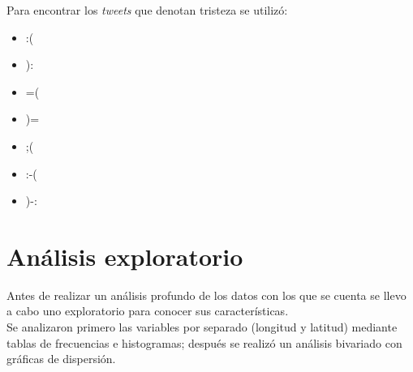 \documentclass{article}
\begin{document}
        \noindent Para encontrar los \emph{tweets} que denotan tristeza se utilizó:
    \begin{multicols}{3}
	\begin{itemize}
        \item :(
        \item ):
        \item =( 
        \item )=
        \item ;(
        \item :-(
        \item )-:
    \end{itemize}
    \end{multicols}
    

\newpage

\section{Análisis exploratorio}

	Antes de realizar un análisis profundo de los datos con los que se cuenta se llevo a cabo uno exploratorio para conocer sus características.\\[.3cm]
%
Se analizaron primero las variables por separado (longitud y latitud) mediante tablas de frecuencias e histogramas; después se realizó un análisis bivariado con gráficas de dispersión. \\[.3cm]
%
\end{document}

